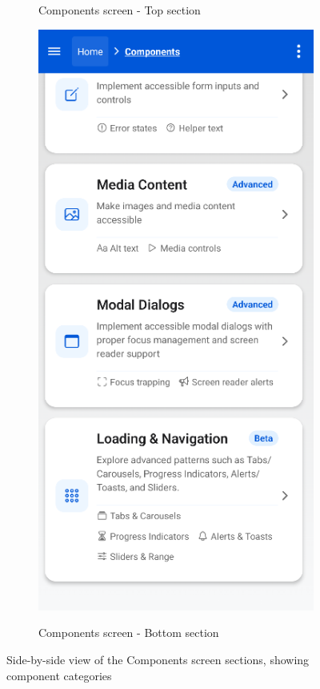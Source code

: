\begin{figure}[ht]
\begin{subfigure}[b]{0.42\textwidth}
        \caption{Components screen - Top section}
        \label{fig:components-top}
    \end{subfigure}
    \hfill
    \begin{subfigure}[b]{0.40\textwidth}
        \centering
        \includegraphics[width=\linewidth, alt={Second part of the Components screen}]{img/components2.png}
        \caption{Components screen - Bottom section}
        \label{fig:components-bottom}
    \end{subfigure}
    \caption{Side-by-side view of the Components screen sections, showing component categories}
    \label{fig:components_screens_sidebyside}
\end{figure}

